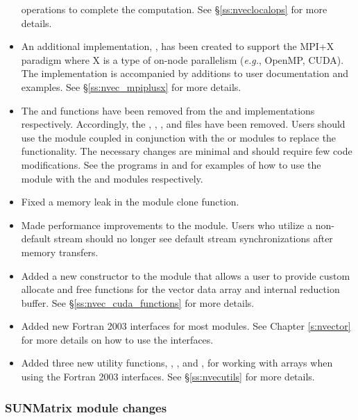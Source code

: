 \begin{itemize}
operations to complete the computation. See \S\ref{ss:nveclocalops} for more
details.
%
\item An additional {\nvector} implementation, {\nvecmpiplusx}, has been created to
support the MPI+X paradigm where X is a type of on-node parallelism
(\textit{e.g.}, OpenMP, CUDA). The implementation is accompanied by additions to
user documentation and {\sundials} examples. See \S\ref{ss:nvec_mpiplusx} for
more details.
%
\item The  and  functions have been removed from the
{\nveccuda} and {\nvecraja} implementations respectively. Accordingly, the
, \newline\noindent
{},
, and 
files have been removed. Users should use the {\nvecmpiplusx} module coupled
in conjunction with the {\nveccuda} or {\nvecraja} modules to replace the
functionality. The necessary changes are minimal and should require few
code modifications. See the programs in  and
 for examples of how to use the {\nvecmpiplusx}
module with the {\nveccuda} and {\nvecraja} modules respectively.
%
\item Fixed a memory leak in the {\nvecpetsc} module clone function.
%
\item Made performance improvements to the {\nveccuda} module. Users who utilize a
non-default stream should no longer see default stream synchronizations
after memory transfers.
%
\item Added a new constructor to the {\nveccuda} module that allows a user to provide
custom allocate and free functions for the vector data array and internal
reduction buffer. See \S\ref{ss:nvec_cuda_functions} for more details.
%
\item Added new Fortran 2003 interfaces for most {\nvector} modules. See Chapter
\ref{s:nvector} for more details on how to use the interfaces.
%
\item Added three new {\nvector} utility functions,
,\newline\noindent
{}, and
,
for working with  arrays when using the Fortran 2003 interfaces.
See \S\ref{ss:nvecutils} for more details.
\end{itemize}

\subsubsection*{SUNMatrix module changes}


